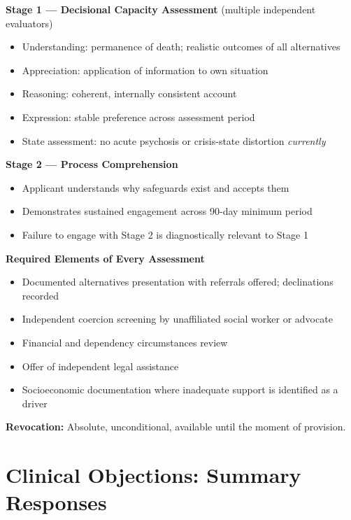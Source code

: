 \documentclass[11pt, letterpaper]{article}
\begin{document}
\begin{findingbox}[title={\sffamily\bfseries\small\color{C@accent}
  Clinical Protocol at a Glance}]
\small
\textbf{Stage 1 --- Decisional Capacity Assessment} (multiple independent evaluators)
\begin{itemize}
  \item Understanding: permanence of death; realistic outcomes of all alternatives
  \item Appreciation: application of information to own situation
  \item Reasoning: coherent, internally consistent account
  \item Expression: stable preference across assessment period
  \item State assessment: no acute psychosis or crisis-state distortion \textit{currently}
\end{itemize}

\medskip
\textbf{Stage 2 --- Process Comprehension}
\begin{itemize}
  \item Applicant understands why safeguards exist and accepts them
  \item Demonstrates sustained engagement across 90-day minimum period
  \item Failure to engage with Stage 2 is diagnostically relevant to Stage 1
\end{itemize}

\medskip
\textbf{Required Elements of Every Assessment}
\begin{itemize}
  \item Documented alternatives presentation with referrals offered; declinations recorded
  \item Independent coercion screening by unaffiliated social worker or advocate
  \item Financial and dependency circumstances review
  \item Offer of independent legal assistance
  \item Socioeconomic documentation where inadequate support is identified as a driver
\end{itemize}

\medskip
\textbf{Revocation:} Absolute, unconditional, available until the moment of provision.
\end{findingbox}

\section{Clinical Objections: Summary Responses}
\end{document}
